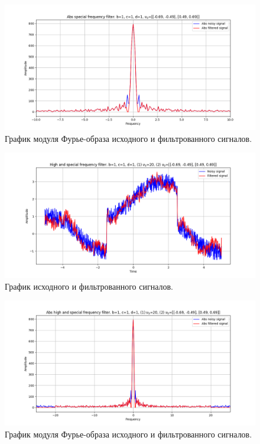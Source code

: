 \documentclass[a4paper, 12pt]{article}
\begin{document}
    \begin{figure}[!htb]
        \centering
        \includegraphics[scale=0.485]{5_1_abs_u_U_nospec.png}
        \captionsetup{skip=0pt}
        \caption{График модуля Фурье-образа исходного и фильтрованного сигналов.}
        \label{fig:fig96}
    \end{figure}
    \begin{figure}[!htb]
        \centering
        \includegraphics[scale=0.485]{5_2_u_flt_u_nospec.png}
        \captionsetup{skip=0pt}
        \caption{График исходного и фильтрованного сигналов.}
        \label{fig:fig97}
    \end{figure}
    \begin{figure}[!htb]
        \centering
        \includegraphics[scale=0.485]{5_2_abs_u_U_nospec.png}
        \captionsetup{skip=0pt}
        \caption{График модуля Фурье-образа исходного и фильтрованного сигналов.}
        \label{fig:fig98}
    \end{figure}
\end{document}
